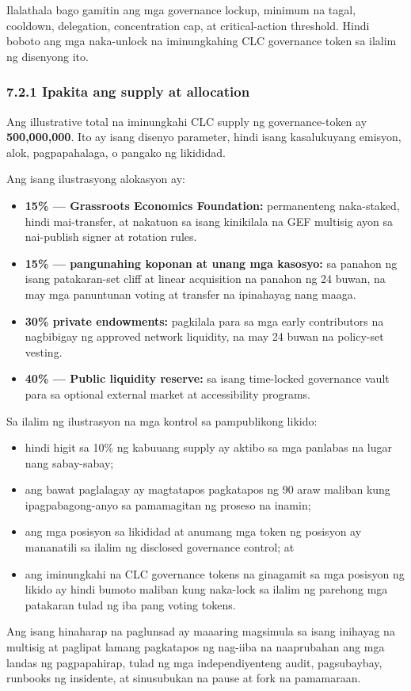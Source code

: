 \documentclass[11pt]{article}
\begin{document}
Ilalathala bago gamitin ang mga governance lockup, minimum na tagal, cooldown, delegation, concentration cap, at critical-action threshold. Hindi boboto ang mga naka-unlock na iminungkahing CLC governance token sa ilalim ng disenyong ito.

\subsubsection*{7.2.1 Ipakita ang supply at allocation}

Ang illustrative total na iminungkahi CLC supply ng governance-token ay \textbf{500,000,000}. Ito ay isang disenyo parameter, hindi isang kasalukuyang emisyon, alok, pagpapahalaga, o pangako ng likididad.

Ang isang ilustrasyong alokasyon ay:

\begin{itemize}[leftmargin=*]
\item \textbf{15\% --- Grassroots Economics Foundation:} permanenteng naka-staked, hindi mai-transfer, at nakatuon sa isang kinikilala na GEF multisig ayon sa nai-publish signer at rotation rules.
\item \textbf{15\% --- pangunahing koponan at unang mga kasosyo:} sa panahon ng isang patakaran-set cliff at linear acquisition na panahon ng 24 buwan, na may mga panuntunan voting at transfer na ipinahayag nang maaga.
\item \textbf{30\%  private endowments:} pagkilala para sa mga early contributors na nagbibigay ng approved network liquidity, na may 24 buwan na policy-set vesting.
\item \textbf{40\% --- Public liquidity reserve:} sa isang time-locked governance vault para sa optional external market at accessibility programs.
\end{itemize}
Sa ilalim ng ilustrasyon na mga kontrol sa pampublikong likido:

\begin{itemize}[leftmargin=*]
\item hindi higit sa 10\% ng kabuuang supply ay aktibo sa mga panlabas na lugar nang sabay-sabay;
\item ang bawat paglalagay ay magtatapos pagkatapos ng 90 araw maliban kung ipagpabagong-anyo sa pamamagitan ng proseso na inamin;
\item ang mga posisyon sa likididad at anumang mga token ng posisyon ay mananatili sa ilalim ng disclosed governance control; at
\item ang iminungkahi na CLC governance tokens na ginagamit sa mga posisyon ng likido ay hindi bumoto maliban kung naka-lock sa ilalim ng parehong mga patakaran tulad ng iba pang voting tokens.
\end{itemize}
Ang isang hinaharap na paglunsad ay maaaring magsimula sa isang inihayag na multisig at paglipat lamang pagkatapos ng nag-iiba na naaprubahan ang mga landas ng pagpapahirap, tulad ng mga independiyenteng audit, pagsubaybay, runbooks ng insidente, at sinusubukan na pause at fork na pamamaraan.
\end{document}
